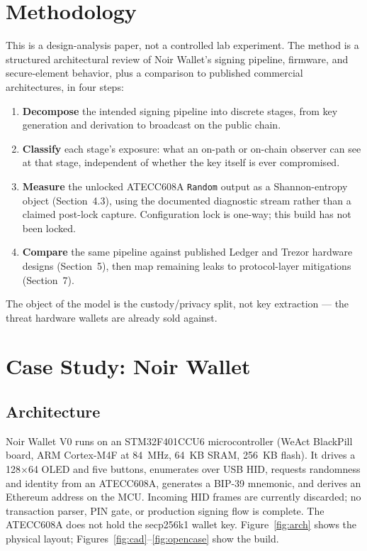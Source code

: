 \documentclass[10pt]{article}
\begin{document}
\section{Methodology}

This is a design-analysis paper, not a controlled lab experiment. The method is a structured architectural review of Noir Wallet's signing pipeline, firmware, and secure-element behavior, plus a comparison to published commercial architectures, in four steps:

\begin{enumerate}[leftmargin=1.3em,itemsep=0.15em]
  \item \textbf{Decompose} the intended signing pipeline into discrete stages, from key generation and derivation to broadcast on the public chain.
  \item \textbf{Classify} each stage's exposure: what an on-path or on-chain observer can see at that stage, independent of whether the key itself is ever compromised.
  \item \textbf{Measure} the unlocked ATECC608A \texttt{Random} output as a Shannon-entropy object (Section~4.3), using the documented diagnostic stream rather than a claimed post-lock capture. Configuration lock is one-way; this build has not been locked.
  \item \textbf{Compare} the same pipeline against published Ledger and Trezor hardware designs (Section~5), then map remaining leaks to protocol-layer mitigations (Section~7).
\end{enumerate}

The object of the model is the custody/privacy split, not key extraction --- the threat hardware wallets are already sold against.

\section{Case Study: Noir Wallet}

\subsection{Architecture}
Noir Wallet V0 runs on an STM32F401CCU6 microcontroller (WeAct BlackPill board, ARM Cortex-M4F at 84~MHz, 64~KB SRAM, 256~KB flash). It drives a 128$\times$64 OLED and five buttons, enumerates over USB HID, requests randomness and identity from an ATECC608A, generates a BIP-39 mnemonic, and derives an Ethereum address on the MCU. Incoming HID frames are currently discarded; no transaction parser, PIN gate, or production signing flow is complete. The ATECC608A does not hold the secp256k1 wallet key. Figure~\ref{fig:arch} shows the physical layout; Figures~\ref{fig:cad}--\ref{fig:opencase} show the build.
\end{document}
